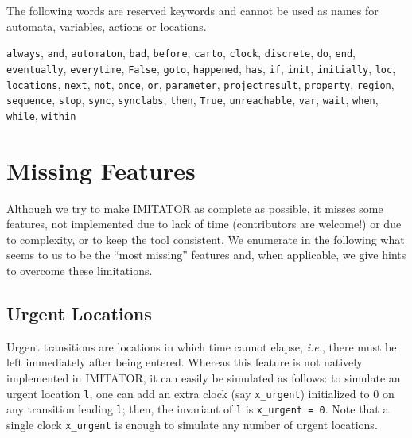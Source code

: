 \documentclass[a4paper,11pt]{report}
\newcommand{\imitator}{\textsf{IMITATOR}}
\newcommand{\styleIMI}[1]{\textcolor{imicolor}{\texttt{#1}}}
\newcommand{\ie}{\textcolor{colorok}{\textit{i.e.}, }}
\begin{document}
The following words are reserved keywords and cannot be used as names for automata, variables, actions or locations. 

\styleIMI{always},
\styleIMI{and},
\styleIMI{automaton},
\styleIMI{bad},
\styleIMI{before},
\styleIMI{carto},
\styleIMI{clock},
\styleIMI{discrete},
\styleIMI{do},
\styleIMI{end},
\styleIMI{eventually},
\styleIMI{everytime},
\styleIMI{False},
\styleIMI{goto},
\styleIMI{happened},
\styleIMI{has},
\styleIMI{if},
\styleIMI{init},
\styleIMI{initially},
\styleIMI{loc},
\styleIMI{locations},
\styleIMI{next},
\styleIMI{not},
\styleIMI{once},
\styleIMI{or},
\styleIMI{parameter},
\styleIMI{projectresult},
\styleIMI{property},
\styleIMI{region},
\styleIMI{sequence},
\styleIMI{stop},
\styleIMI{sync},
\styleIMI{synclabs},
\styleIMI{then},
\styleIMI{True},
\styleIMI{unreachable},
\styleIMI{var},
\styleIMI{wait},
\styleIMI{when},
\styleIMI{while},
\styleIMI{within}






\chapter{Missing Features}

Although we try to make \imitator{} as complete as possible, it misses some features, not implemented due to lack of time (contributors are welcome!) or due to complexity, or to keep the tool consistent.
We enumerate in the following what seems to us to be the ``most missing'' features and, when applicable, we give hints to overcome these limitations.


\section{Urgent Locations}

Urgent transitions are locations in which time cannot elapse, \ie{} there must be left immediately after being entered.
Whereas this feature is not natively implemented in \imitator{}, it can easily be simulated as follows:
to simulate an urgent location \styleIMI{l}, one can add an extra clock (say \styleIMI{x\_urgent}) initialized to 0 on any transition leading \styleIMI{l}; then, the invariant of \styleIMI{l} is \styleIMI{x\_urgent = 0}.
Note that a single clock \styleIMI{x\_urgent} is enough to simulate any number of urgent locations.
\end{document}
